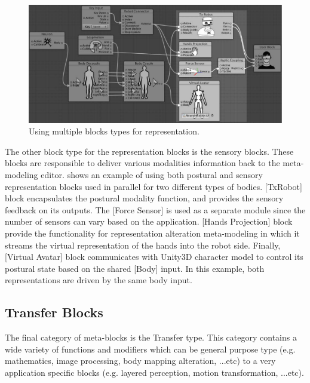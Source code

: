 \begin{figure}[htpb]
\centering
  \captionsetup{justification=centering}
\includegraphics[width=1\textwidth]{figures/system/Blocks/Representation.pdf}
\caption{Using multiple blocks types for representation.}
  \label{fig:system-representatio-blocks}
\end{figure}


The other block type for the representation blocks is the sensory blocks. These blocks are responsible to deliver various modalities information back to the meta-modeling editor.  shows an example of using both postural and sensory representation blocks used in parallel for two different types of bodies. [TxRobot] block encapsulates the postural modality function, and provides the sensory feedback on its outputs. The [Force Sensor] is used as a separate module since the number of sensors can vary based on the application. [Hands Projection] block provide the functionality for representation alteration meta-modeling in which it streams the virtual representation of the hands into the robot side. Finally, [Virtual Avatar] block communicates with Unity3D character model to control its postural state based on the shared [Body] input. In this example, both representations are driven by the same body input.



\subsection{Transfer Blocks}

The final category of meta-blocks is the Transfer type. This category contains a wide variety of functions and modifiers which can be general purpose type (e.g. mathematics, image processing, body mapping alteration, ...etc) to a very application specific blocks (e.g. layered perception, motion transformation, ...etc). 

